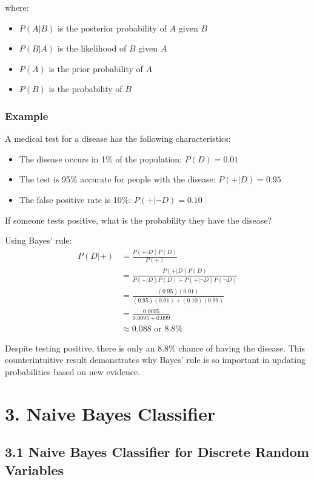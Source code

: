\documentclass{article}
\begin{document}
where:
\begin{itemize}
    \item $P(A|B)$ is the posterior probability of $A$ given $B$
    \item $P(B|A)$ is the likelihood of $B$ given $A$
    \item $P(A)$ is the prior probability of $A$
    \item $P(B)$ is the probability of $B$
\end{itemize}

\subsubsection*{Example}
A medical test for a disease has the following characteristics:
\begin{itemize}
    \item The disease occurs in 1\% of the population: $P(D) = 0.01$
    \item The test is 95\% accurate for people with the disease: $P(+|D) = 0.95$
    \item The false positive rate is 10\%: $P(+|\neg D) = 0.10$
\end{itemize}

If someone tests positive, what is the probability they have the disease?

Using Bayes' rule:
\begin{align*}
P(D|+) &= \frac{P(+|D)P(D)}{P(+)} \\
&= \frac{P(+|D)P(D)}{P(+|D)P(D) + P(+|\neg D)P(\neg D)} \\
&= \frac{(0.95)(0.01)}{(0.95)(0.01) + (0.10)(0.99)} \\
&= \frac{0.0095}{0.0095 + 0.099} \\
&\approx 0.088 \text{ or } 8.8\%
\end{align*}

Despite testing positive, there is only an 8.8\% chance of having the disease. This counterintuitive result demonstrates why Bayes' rule is so important in updating probabilities based on new evidence.






\section*{3. Naive Bayes Classifier}

\subsection*{3.1 Naive Bayes Classifier for Discrete Random Variables}
\end{document}
